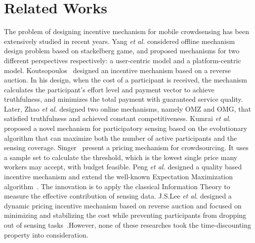 \documentclass[10pt,journal,letterpaper,compsoc]{IEEEtran}
\newcommand{\et}{{\em et al. }}
\begin{document}



\section{Related Works}

The problem of designing incentive mechanism for mobile crowdsensing has been extensively studied in recent years. Yang \et\cite{yang2012crowdsourcing} considered offline mechanism design problem based on stackelberg game, and proposed mechanisms for two different perspectives respectively: a user-centric model and a platform-centric model. Koutsopoulos~\cite{koutsopoulos2013optimal} designed an incentive mechanism based on a reverse auction. In his design, when the cost of a participant is received, the mechanism calculates the participant's effort level and payment vector to achieve truthfulness, and minimizes the total payment with guaranteed service quality. Later, Zhao \et\cite{zhao2014crowdsource} designed two online mechanisms, namely OMZ and OMG, that satisfied truthfulness and achieved constant competitiveness. Kumrai \et\cite{7037601} proposed a novel mechanism for participatory sensing based on the evolutionary algorithm that can maximize both the number of active participants and the sensing coverage. Singer~\cite{singer2013pricing} present a pricing mechanism for crowdsourcing. It uses a sample set to calculate the threshold, which is the lowest single price many workers may accept, with budget feasible.  Peng \et designed a quality based incentive mechanism and extend the well-known Expectation Maximization algorithm~\cite{peng2015pay}. The innovation is to apply the classical Information Theory to measure the effective contribution of sensing data. J.S.Lee \et  designed a dynamic pricing incentive mechanism based on reverse auction and focused on minimizing and stabilizing the cost while preventing participants from dropping out of sensing tasks~\cite{lee2010dynamic}.However, none of these researches took the time-discounting property into consideration.
\end{document}
